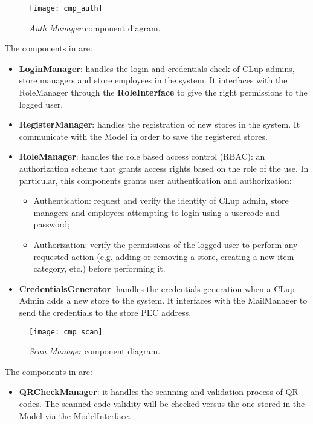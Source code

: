\begin{figure}[H]
	\centering
	\texttt{[image: cmp\_auth]}
	\caption{\textit{Auth Manager} component diagram.}
	\label{fig:cmp_auth}
\end{figure}

The components in  are:
\begin{itemize}
	\item \textbf{LoginManager}: handles the login and credentials check of CLup admins, store managers and store employees in the system. It interfaces with the RoleManager through the \textbf{RoleInterface} to give the right permissions to the logged user.
	
	\item \textbf{RegisterManager}: handles the registration of new stores in the system. It communicate with the Model in order to save the registered stores.
	
	\item \textbf{RoleManager}: handles the role based access control (RBAC): an authorization scheme that grants access rights based on the role of the use. In particular, this components grants user authentication and authorization:
	\begin{itemize}
		\item Authentication: request and verify the identity of CLup admin, store managers and employees attempting to login using a usercode and password;
		\item Authorization: verify the permissions of the logged user to perform any requested action (e.g. adding or removing a store, creating a new item category, etc.) before performing it.
	\end{itemize}
		
	\item \textbf{CredentialsGenerator}: handles the credentials generation when a CLup Admin adds a new store to the system. It interfaces with the MailManager to send the credentials to the store PEC address.
\end{itemize}


\begin{figure}[H]
	\centering
	\texttt{[image: cmp\_scan]}
	\caption{\textit{Scan Manager} component diagram.}
	\label{fig:cmp_scan}
\end{figure}

The components in  are:
\begin{itemize}
	\item \textbf{QRCheckManager}: it handles the scanning and validation process of QR codes. The scanned code validity will be checked versus the one stored in the Model via the ModelInterface.
\end{itemize}

